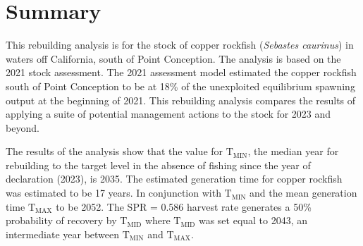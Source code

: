 \documentclass[11pt,
  english,
  a4paper,
]{article}
\begin{document}
\newcommand{\lt}{\ensuremath <}
\newcommand{\gt}{\ensuremath >}

\pagebreak
{}
\setcounter{page}{1}

\renewcommand{\thetable}{\roman{table}}
\renewcommand{\thefigure}{\roman{figure}}

\setlength\parskip{0.5em plus 0.1em minus 0.2em}


\hypertarget{summary}{%
\section*{Summary}\label{summary}}

\leavevmode\tagmcend\tagstructend


This rebuilding analysis is for the stock of copper rockfish (\emph{Sebastes caurinus}) in waters off California, south of Point Conception. The analysis is based on the 2021 stock assessment. The 2021 assessment model estimated the copper rockfish south of Point Conception to be at 18\% of the unexploited equilibrium spawning output at the beginning of 2021. This rebuilding analysis compares the results of applying a suite of potential management actions to the stock for 2023 and beyond.

\leavevmode\tagmcend\tagstructend\par


The results of the analysis show that the value for {\(\text{T}_\text{MIN}\)\leavevmode\tagmcend\tagstructend}, the median year for rebuilding to the target level in the absence of fishing since the year of declaration (2023), is 2035. The estimated generation time for copper rockfish was estimated to be 17 years. In conjunction with {\(\text{T}_\text{MIN}\)\leavevmode\tagmcend\tagstructend} and the mean generation time {\(\text{T}_\text{MAX}\)\leavevmode\tagmcend\tagstructend} to be 2052. The SPR = 0.586 harvest rate generates a 50\% probability of recovery by {\(\text{T}_\text{MID}\)\leavevmode\tagmcend\tagstructend} where {\(\text{T}_\text{MID}\)\leavevmode\tagmcend\tagstructend} was set equal to 2043, an intermediate year between {\(\text{T}_\text{MIN}\)\leavevmode\tagmcend\tagstructend} and {\(\text{T}_\text{MAX}\)\leavevmode\tagmcend\tagstructend}.
\end{document}
